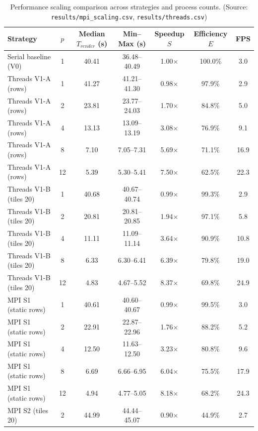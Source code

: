 \begin{table}[htbp]
\centering
\footnotesize
\setlength{\tabcolsep}{4pt}
\caption{Performance scaling comparison across strategies and process counts. (Source: \texttt{results/mpi\_scaling.csv}, \texttt{results/threads.csv})}
\label{tab:scaling_summary}
\begin{tabular}{lcccccc}
\toprule
\textbf{Strategy} & $p$ & \textbf{Median} $T_{render}$ (s) & \textbf{Min--Max} (s) & \textbf{Speedup} $S$ & \textbf{Efficiency} $E$ & \textbf{FPS} \\
\midrule
Serial baseline (V0) & 1 & 40.41 & 36.48--40.49 & 1.00$\times$ & 100.0\% & 3.0 \\
Threads V1-A (rows) & 1 & 41.27 & 41.21--41.30 & 0.98$\times$ & 97.9\% & 2.9 \\
Threads V1-A (rows) & 2 & 23.81 & 23.77--24.03 & 1.70$\times$ & 84.8\% & 5.0 \\
Threads V1-A (rows) & 4 & 13.13 & 13.09--13.19 & 3.08$\times$ & 76.9\% & 9.1 \\
Threads V1-A (rows) & 8 & 7.10 & 7.05--7.31 & 5.69$\times$ & 71.1\% & 16.9 \\
Threads V1-A (rows) & 12 & 5.39 & 5.30--5.41 & 7.50$\times$ & 62.5\% & 22.3 \\
Threads V1-B (tiles 20) & 1 & 40.68 & 40.67--40.74 & 0.99$\times$ & 99.3\% & 2.9 \\
Threads V1-B (tiles 20) & 2 & 20.81 & 20.81--20.85 & 1.94$\times$ & 97.1\% & 5.8 \\
Threads V1-B (tiles 20) & 4 & 11.11 & 11.09--11.14 & 3.64$\times$ & 90.9\% & 10.8 \\
Threads V1-B (tiles 20) & 8 & 6.33 & 6.30--6.41 & 6.39$\times$ & 79.8\% & 19.0 \\
Threads V1-B (tiles 20) & 12 & 4.83 & 4.67--5.52 & 8.37$\times$ & 69.8\% & 24.9 \\
MPI S1 (static rows) & 1 & 40.61 & 40.60--40.67 & 0.99$\times$ & 99.5\% & 3.0 \\
MPI S1 (static rows) & 2 & 22.91 & 22.87--22.96 & 1.76$\times$ & 88.2\% & 5.2 \\
MPI S1 (static rows) & 4 & 12.50 & 11.63--12.50 & 3.23$\times$ & 80.8\% & 9.6 \\
MPI S1 (static rows) & 8 & 6.69 & 6.66--6.95 & 6.04$\times$ & 75.5\% & 17.9 \\
MPI S1 (static rows) & 12 & 4.94 & 4.77--5.05 & 8.18$\times$ & 68.2\% & 24.3 \\
MPI S2 (tiles 20) & 2 & 44.99 & 44.44--45.07 & 0.90$\times$ & 44.9\% & 2.7 \\

\end{tabular}
\end{table}
